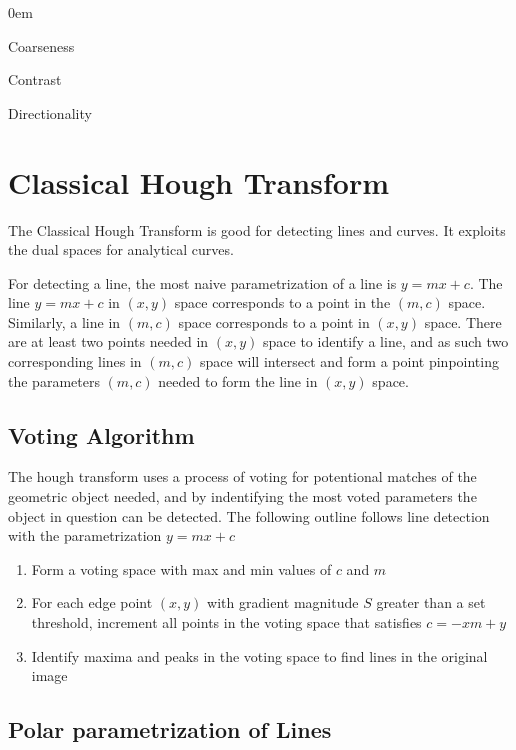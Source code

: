 \documentclass{article}
\begin{document}
\begin{multicols}{3}
\begin{itemize}
\itemsep0em
\begin{multicols}{3}
\item {Coarseness}
\item {Contrast}
\item {Directionality}
\end{multicols}
\end{itemize}

\section{Classical Hough Transform}

The Classical Hough Transform is good for detecting lines and curves. It exploits the dual spaces for analytical curves.

For detecting a line, the most naive parametrization of a line is $y = mx + c$. The line $y = mx + c$ in $(x,y)$ space corresponds to a point in the $(m,c)$ space. Similarly, a line in $(m,c)$ space corresponds to a point in $(x,y)$ space. There are at least two points needed in $(x,y)$ space to identify a line, and as such two corresponding lines in $(m,c)$ space will intersect and form a point pinpointing the parameters $(m,c)$ needed to form the line in $(x,y)$ space.

\subsection{Voting Algorithm}

The hough transform uses a process of voting for potentional matches of the geometric object needed, and by indentifying the most voted parameters the object in question can be detected. The following outline follows line detection with the parametrization $y = mx + c$

\begin{enumerate}
\itemsep0em
\item Form a voting space with max and min values of $c$ and $m$
\item For each edge point $(x,y)$ with gradient magnitude $S$ greater than a set threshold, increment all points in the voting space that satisfies $c = -xm + y$
\item Identify maxima and peaks in the voting space to find lines in the original image
\end{enumerate}

\subsection{Polar parametrization of Lines}


\end{multicols}
\end{document}
